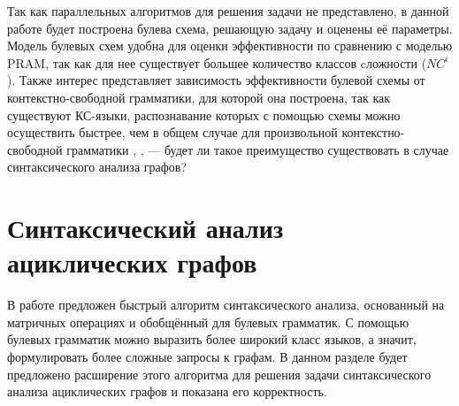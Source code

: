 Так как параллельных алгоритмов для решения задачи не представлено, в данной работе будет построена булева схема, решающую задачу и оценены её параметры. Модель булевых схем удобна для оценки эффективности по сравнению с моделью PRAM, так как для нее существует большее количество классов cложности (${NC}^i$). Также интерес представляет зависимость эффективности булевой схемы от контекстно-свободной грамматики, для которой она построена, так как существуют КС-языки, распознавание которых с помощью схемы можно осуществить быстрее, чем в общем случае для произвольной контекстно-свободной грамматики \cite{Ibarra}, \cite{Dymond}, \cite{LLComp} --- будет ли такое преимущество существовать в случае синтаксического анализа графов?

\section{Синтаксический анализ ациклических графов}
В работе \cite{OkhotinParse} предложен быстрый алгоритм синтаксического
анализа, основанный на матричных операциях и обобщённый для
булевых грамматик. С помощью булевых грамматик можно выразить
более широкий класс языков, а значит, формулировать более
сложные запросы к графам.  В данном разделе будет предложено
расширение этого алгоритма для решения задачи синтаксического
анализа ациклических графов и показана его корректность.
